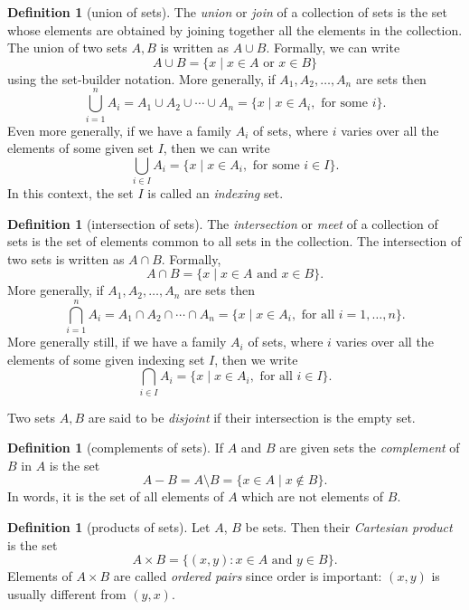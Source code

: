 \documentclass[11pt]{article}
\theoremstyle{definition}
\newtheorem{defn}[thm]{Definition}
\begin{document}
\begin{defn}[union of sets]
  The {\em union} or {\em join} of a collection
  of sets is the set whose elements are obtained by joining together
  all the elements in the collection. The union of two sets $A, B$ is
  written as $A \cup B$. Formally, we can write
  \[
  A \cup B = \{ x \mid x\in A \text{ or } x\in B\}
  \]
  using the set-builder notation.  More generally, if $A_1, A_2,
  \dots, A_n$ are sets then
  \[
  \bigcup_{i=1}^n A_i = A_1 \cup A_2 \cup \cdots \cup A_n = \{x \mid
  x\in A_i, \text{ for some } i\}.  
  \]
  Even more generally, if we have a family $A_i$ of sets, where $i$
  varies over all the elements of some given set $I$, then we can
  write
  \[
  \bigcup_{i\in I} A_i = \{x \mid x\in A_i, \text{ for some } i \in I\}.
  \]
  In this context, the set $I$ is called an {\em indexing} set.
\end{defn}

\begin{defn}[intersection of sets]
The {\em intersection} or {\em meet} of a collection of sets is the
set of elements common to all sets in the collection. The intersection
of two sets is written as $A \cap B$.  Formally,
$$
A \cap B = \{ x \mid x\in A \text{ and } x\in B \}.
$$
More generally, if $A_1, A_2, \dots, A_n$ are sets then 
$$
\bigcap_{i=1}^n A_i = A_1 \cap A_2 \cap \cdots \cap A_n = \{x \mid
x\in A_i, \text{ for all } i=1, \dots, n\}.  
$$ 
More generally still, if we have a family $A_i$ of sets, where $i$
varies over all the elements of some given indexing set $I$, then we
write
$$
\bigcap_{i\in I} A_i = \{x \mid x\in A_i, \text{ for all } i \in I\}.
$$
\end{defn}

Two sets $A,B$ are said to be \emph{disjoint} if their intersection is
the empty set.


\begin{defn}[complements of sets]
  If $A$ and $B$ are given sets the {\em complement} of $B$ in $A$ is
  the set
  \[
  A-B = A \setminus B = \{ x\in A \mid x\notin B \}.
  \]
  In words, it is the set of all elements of $A$ which are not
  elements of $B$.
\end{defn} 


\begin{defn}[products of sets]
  Let $A$, $B$ be sets. Then their {\em Cartesian product} is the set
  \[
  A \times B = \{ (x,y) : x\in A \text{ and }y\in B \}.
  \]
  Elements of $A \times B$ are called \emph{ordered pairs} since order
  is important: $(x,y)$ is usually different from $(y,x)$.
\end{defn}
\end{document}
